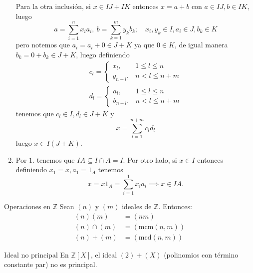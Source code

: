 \begin{proofbox}
\begin{enumerate}
        Para la otra inclusión, si \(x \in IJ + IK\) entonces \(x = a + b\) con \(a \in IJ, b \in IK\), luego 
        \[
        a = \sum_{i=1}^n x_i a_i,\ b = \sum_{k=1}^m y_k b_k; \quad x_i, y_k \in I, a_i \in J, b_k \in K 
        \]
        pero notemos que $a_i = a_i + 0 \in J + K$ ya que $0 \in K$, de igual manera $b_k = 0 + b_k \in J + K$, luego definiendo
        \begin{align*}
        c_l =
            \begin{cases} 
                x_l, & 1 \leq l \leq n \\
                y_{n-l}, & n < l \leq n+m
            \end{cases} \\
        d_l = 
            \begin{cases} 
                a_l, & 1 \leq l \leq n \\
                b_{n-l}, & n < l \leq n+m
            \end{cases}
        \end{align*}
        tenemos que $c_l \in I, d_l \in J + K$ y 
        \[
        x = \sum_{l=1}^{n+m} c_l d_l
        \]
        luego \(x \in I(J + K)\).

        \item Por $1.$ tenemos que $IA \subseteq I \cap A = I$. Por otro lado, si $x \in I$ entonces definiendo $x_1 = x, a_1 = 1_A$ tenemos
        \[
        x = x 1_A = \sum_{i=1}^1 x_i a_i \implies x \in IA.
        \]
    \end{enumerate}
\end{proofbox}

\begin{example}{Operaciones en \(\mathbb{Z}\)}{}
    Sean \((n)\) y \((m)\) ideales de \(\mathbb{Z}\). Entonces:
    \begin{align*}
        (n)(m) &= (nm) \\
        (n) \cap (m) &= (\mathrm{mcm}(n, m)) \\
        (n) + (m) &= (\mathrm{mcd}(n, m))
    \end{align*}
\end{example}

\begin{example}{Ideal no principal}{}
    En \(\mathbb{Z}[X]\), el ideal \((2) + (X)\) (polinomios con término constante par) no es principal.
\end{example}


